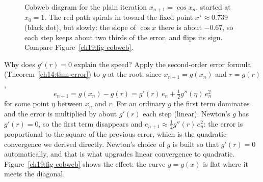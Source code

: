 \begin{figure}[htbp]
\centering
{}
\caption{Cobweb diagram for the plain iteration $x_{n+1}=\cos x_n$, started at
$x_0=1$. The red path spirals in toward the fixed point $x^\star\approx0.739$
(black dot), but slowly: the slope of $\cos x$ there is about $-0.67$, so each
step keeps about two thirds of the error, and flips its sign. Compare
Figure~\ref{ch19:fig-cobweb}.}
\label{ch19:fig-cobweb-cos}
\end{figure}

\begin{whybox}
Why does $g'(r) = 0$ explain the speed? Apply the second-order error formula
(Theorem~\ref{ch14:thm-error}) to $g$ at the root: since $x_{n+1} = g(x_n)$ and
$r = g(r)$,
\[
  e_{n+1} = g(x_n) - g(r) = g'(r)\,e_n + \tfrac12 g''(\eta)\,e_n^2
\]
for some point $\eta$ between $x_n$ and $r$. For an ordinary $g$ the first term
dominates and the error is multiplied by about $g'(r)$ each step (linear). Newton's
$g$ has $g'(r) = 0$, so the first term disappears and
$e_{n+1} \approx \tfrac12 g''(r)\,e_n^2$: the error is proportional to the square
of the previous error, which is the quadratic convergence we derived directly.
Newton's choice of $g$ is built so that $g'(r) = 0$ automatically, and that is what
upgrades linear convergence to quadratic. Figure~\ref{ch19:fig-cobweb} shows the
effect: the curve $y = g(x)$ is flat where it meets the diagonal.
\end{whybox}

